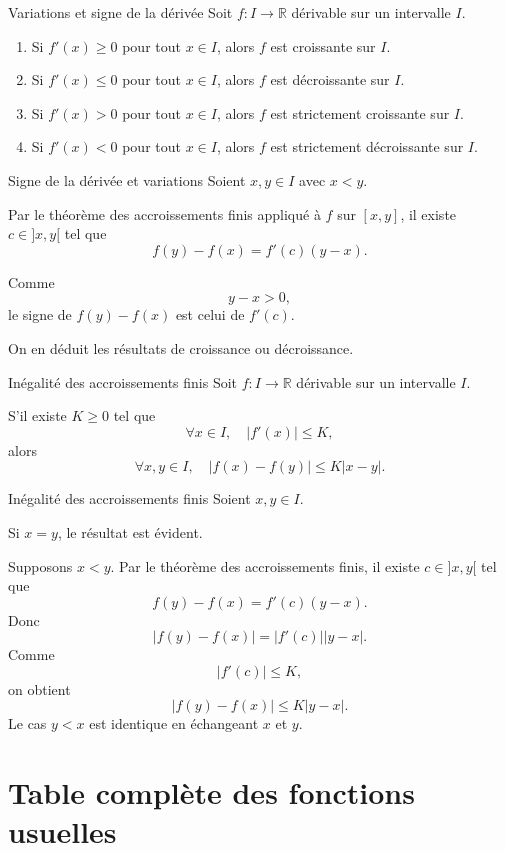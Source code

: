 \documentclass[11pt,a4paper]{article}
\newcommand{\R}{\mathbb{R}}
\begin{document}
\begin{theorembox}{Variations et signe de la dérivée}
Soit $f:I\to\R$ dérivable sur un intervalle $I$.

\begin{enumerate}[label=\arabic*)]
    \item Si $f'(x)\geq0$ pour tout $x\in I$, alors $f$ est croissante sur $I$.
    \item Si $f'(x)\leq0$ pour tout $x\in I$, alors $f$ est décroissante sur $I$.
    \item Si $f'(x)>0$ pour tout $x\in I$, alors $f$ est strictement croissante sur $I$.
    \item Si $f'(x)<0$ pour tout $x\in I$, alors $f$ est strictement décroissante sur $I$.
\end{enumerate}
\end{theorembox}

\begin{proofbox}{Signe de la dérivée et variations}
Soient $x,y\in I$ avec $x<y$.

Par le théorème des accroissements finis appliqué à $f$ sur $[x,y]$, il existe $c\in]x,y[$ tel que
\[
f(y)-f(x)=f'(c)(y-x).
\]

Comme
\[
y-x>0,
\]
le signe de $f(y)-f(x)$ est celui de $f'(c)$.

On en déduit les résultats de croissance ou décroissance.
\end{proofbox}

\begin{theorembox}{Inégalité des accroissements finis}
Soit $f:I\to\R$ dérivable sur un intervalle $I$.

S'il existe $K\geq0$ tel que
\[
\forall x\in I,\quad |f'(x)|\leq K,
\]
alors
\[
\forall x,y\in I,\quad |f(x)-f(y)|\leq K|x-y|.
\]
\end{theorembox}

\begin{proofbox}{Inégalité des accroissements finis}
Soient $x,y\in I$.

Si $x=y$, le résultat est évident.

Supposons $x<y$. Par le théorème des accroissements finis, il existe $c\in]x,y[$ tel que
\[
f(y)-f(x)=f'(c)(y-x).
\]
Donc
\[
|f(y)-f(x)|=|f'(c)||y-x|.
\]
Comme
\[
|f'(c)|\leq K,
\]
on obtient
\[
|f(y)-f(x)|\leq K|y-x|.
\]
Le cas $y<x$ est identique en échangeant $x$ et $y$.
\end{proofbox}

\section{Table complète des fonctions usuelles}
\end{document}
